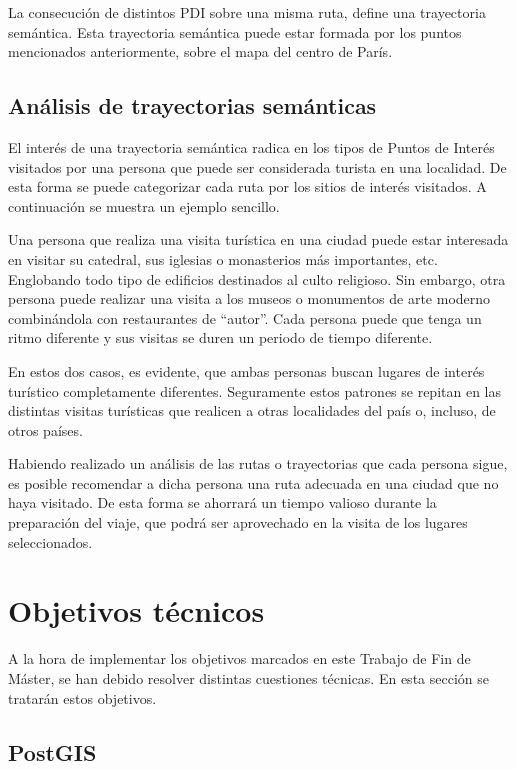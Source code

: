La consecución de distintos PDI sobre una misma ruta, define una trayectoria semántica. Esta trayectoria semántica puede estar formada por los puntos mencionados anteriormente, sobre el mapa del centro de París.

\subsection{Análisis de trayectorias semánticas}

El interés de una trayectoria semántica radica en los tipos de Puntos de Interés visitados por una persona que puede ser considerada turista en una localidad. De esta forma se puede categorizar cada ruta por los sitios de interés visitados. A continuación se muestra un ejemplo sencillo.

Una persona que realiza una visita turística en una ciudad puede estar interesada en visitar su catedral, sus iglesias o monasterios más importantes, etc. Englobando todo tipo de edificios destinados al culto religioso. Sin embargo, otra persona puede realizar una visita a los museos o monumentos de arte moderno combinándola con restaurantes de ``autor''. Cada persona puede que tenga un ritmo diferente y sus visitas se duren un periodo de tiempo diferente.

En estos dos casos, es evidente, que ambas personas buscan lugares de interés turístico completamente diferentes. Seguramente estos patrones se repitan en las distintas visitas turísticas que realicen a otras localidades del país o, incluso, de otros países.

Habiendo realizado un análisis de las rutas o trayectorias que cada persona sigue, es posible recomendar a dicha persona una ruta adecuada en una ciudad que no haya visitado. De esta forma se ahorrará un tiempo valioso durante la preparación del viaje, que podrá ser aprovechado en la visita de los lugares seleccionados.


\section{Objetivos técnicos}

A la hora de implementar los objetivos marcados en este Trabajo de Fin de Máster, se han debido resolver distintas cuestiones técnicas. En esta sección se tratarán estos objetivos.

\subsection{PostGIS}

